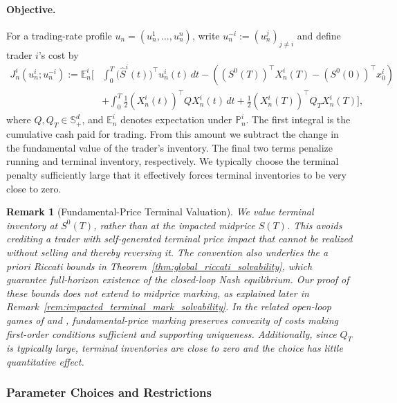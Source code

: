\documentclass[12pt]{article}
\numberwithin{equation}{section}
\newtheorem{remark}[theorem]{Remark}
\theoremstyle{definition}
\begin{document}
\paragraph{Objective.} For a trading-rate profile
\(u_n=(u_n^1,\ldots,u_n^n)\), write
\(u_n^{-i}:=(u_n^j)_{j\ne i}\) and define trader \(i\)'s cost by
\begin{equation}\label{eq:overview_player_objective}
\begin{aligned}
J_n^i(u_n^i;u_n^{-i})
:=
\mathbb E_n^i\Bigg[
&\int_0^T \big(\widehat S^i(t)\big)^\top u_n^i(t)\,dt
-\left((S^0(T))^\top X_n^i(T)-(S^0(0))^\top x_0^i\right)\\
&+\int_0^T \frac{1}{2}(X_n^i(t))^\top Q X_n^i(t)\,dt
+\frac{1}{2}(X_n^i(T))^\top Q_T X_n^i(T)
\Bigg],
\end{aligned}
\end{equation}
where \(Q,Q_T\in\mathbb S_+^d\), and \(\mathbb E_n^i\) denotes expectation
under \(\mathbb P_n^i\). The first integral is the cumulative cash paid for
trading. From this amount we subtract the change in the fundamental value of
the trader's inventory. The final two terms penalize running and terminal
inventory, respectively. We typically choose the terminal penalty sufficiently
large that it effectively forces terminal inventories to be very close to
zero.

\begin{remark}[Fundamental-Price Terminal Valuation]
We value terminal inventory at \(S^0(T)\), rather than at the impacted midprice
\(S(T)\). This avoids crediting a trader with self-generated terminal price
impact that cannot be realized without selling and thereby reversing it. The
convention also underlies the a priori Riccati bounds in
Theorem~\ref{thm:global_riccati_solvability}, which guarantee full-horizon
existence of the closed-loop Nash equilibrium. Our proof of these bounds does
not extend to midprice marking, as explained later in
Remark~\ref{rem:impacted_terminal_mark_solvability}. In the related open-loop
games of \citet{NeumanVoss2023} and
\citet{campbell2026optimalexecutionntraders},
fundamental-price
marking preserves convexity of costs
making first-order conditions sufficient and supporting uniqueness. Additionally, since
\(Q_T\) is typically large, terminal inventories are close to zero and the
choice has little quantitative effect.
\end{remark}

\subsubsection{Parameter Choices and Restrictions}%
\label{subsec:parameter_choices_and_restrictions}
\end{document}
